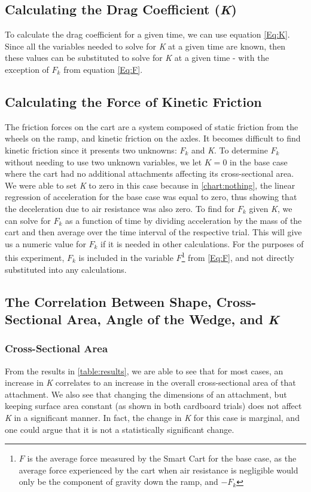 \subsection{Calculating the Drag Coefficient (\textit{K})}
To calculate the drag coefficient for a given time, we can use equation \ref{Eq:K}.
Since all the variables needed to solve for \textit{K} at a given time are known, then 
these values can be substituted to solve for \textit{K} at a given time - with the exception of $F_{k}$ from
equation \ref{Eq:F}. 

\subsection{Calculating the Force of Kinetic Friction}
The friction forces on the cart are a system
composed of static friction from the wheels on the ramp, and kinetic friction on the axles. It
becomes difficult to find kinetic friction since it presents two unknowns: $F_{k}$ and \textit{K}.
To determine $F_{k}$ without needing to use two unknown variables, we let $K = 0$ in the base case
where the cart had no additional attachments affecting its cross-sectional area. We were able to set \textit{K}
to zero in this case because in \ref{chart:nothing}, the linear regression of acceleration for the base case was equal to zero, thus showing
that the deceleration due to air resistance was also zero. To find for $F_{k}$ given \textit{K}, we can solve
for $F_{k}$ as a function of time by dividing acceleration by the mass of the cart and then average over the time interval
of the respective trial. This will give us a numeric value for $F_{k}$ if it is needed in other calculations.
For the purposes of this experiment, $F_{k}$ is included in the variable $F$\footnote{$F$ is the average force measured by the Smart Cart for the base case, as the average
force experienced by the cart when air resistance is negligible would only be the component of gravity down the ramp, and $-F_{k}$} from \ref{Eq:F}, and not directly
substituted into any calculations.

\subsection{The Correlation Between Shape, Cross-Sectional Area, Angle of the Wedge, and \textit{K}}

\subsubsection{Cross-Sectional Area}
From the results in \ref{table:results}, we are able to see that for most cases, an increase in \textit{K}
correlates to an increase in the overall cross-sectional area of that attachment. We also see that changing the dimensions
of an attachment, but keeping surface area constant (as shown in both cardboard trials) does not affect \textit{K} in a
significant manner. In fact, the change in \textit{K} for this case is marginal, and one could argue that it is not a statistically significant
change.


